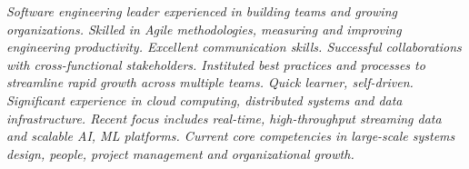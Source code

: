 {\selectfont
	\begin{small}
		\begin{justify}\textit{Software engineering leader experienced in building teams and growing organizations. Skilled in Agile methodologies, measuring and improving engineering productivity. Excellent communication skills. Successful collaborations with cross-functional stakeholders. Instituted best practices and processes to streamline rapid growth across multiple teams. Quick learner, self-driven. Significant experience in cloud computing, distributed systems and data infrastructure. Recent focus includes real-time, high-throughput streaming data and scalable AI, ML platforms. Current core competencies in large-scale systems design, people, project management and organizational growth.}\end{justify}
	\end{small}
}
\vspace{-12pt}